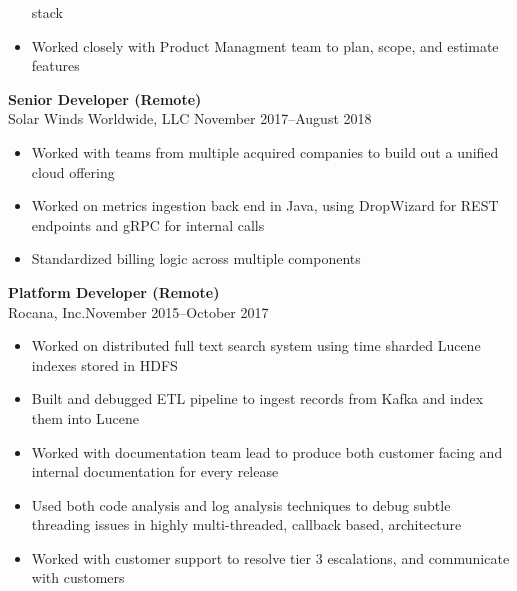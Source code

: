 \documentclass[margin]{res}
\begin{document}
\begin{resume}
\begin{itemize}
            stack
        \item Worked closely with Product Managment team to plan, scope, and
            estimate features
    \end{itemize}
{\bf Senior Developer (Remote)} \\
    Solar Winds Worldwide, LLC \hfill November 2017--August 2018
    \begin{itemize}
        \item Worked with teams from multiple acquired companies to build out
            a unified cloud offering
        \item Worked on metrics ingestion back end in Java, using DropWizard
            for REST endpoints and gRPC for internal calls
        \item Standardized billing logic across multiple components
    \end{itemize}
{\bf Platform Developer (Remote)}\\
    Rocana, Inc.\hfill November 2015--October 2017
\begin{itemize}
    \item Worked on distributed full text search system using time sharded
        Lucene indexes stored in HDFS
    \item Built and debugged ETL pipeline to ingest records from Kafka
        and index them into Lucene
    \item Worked with documentation team lead to produce both customer facing
        and internal documentation for every release
    \item Used both code analysis and log analysis techniques to debug subtle
        threading issues in highly multi-threaded, callback based, architecture
    \item Worked with customer support to resolve tier 3 escalations, and
        communicate with customers
\end{itemize}


\end{resume}
\end{document}
